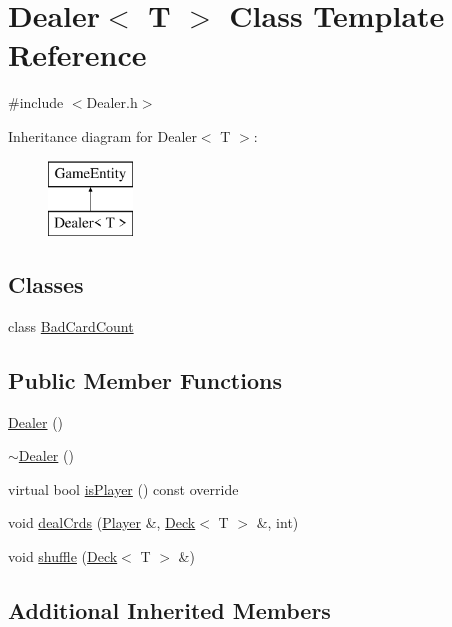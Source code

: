 \hypertarget{class_dealer}{}\section{Dealer$<$ T $>$ Class Template Reference}
\label{class_dealer}


{\ttfamily \#include $<$Dealer.\+h$>$}

Inheritance diagram for Dealer$<$ T $>$\+:\begin{figure}[H]
\begin{center}
\leavevmode
\includegraphics[height=2.000000cm]{class_dealer}
\end{center}
\end{figure}
\subsection*{Classes}
\begin{DoxyCompactItemize}
\item 
class \mbox{\hyperlink{class_dealer_1_1_bad_card_count}{Bad\+Card\+Count}}
\end{DoxyCompactItemize}
\subsection*{Public Member Functions}
\begin{DoxyCompactItemize}
\item 
\mbox{\hyperlink{class_dealer_a6b2f0b132a7aac7650308365f9bb5cd7}{Dealer}} ()
\item 
\mbox{\hyperlink{class_dealer_a775914655b99de05565bcc2e117f47c5}{$\sim$\+Dealer}} ()
\item 
virtual bool \mbox{\hyperlink{class_dealer_aa59b2493c7935d90eeb046433af00fa2}{is\+Player}} () const override
\item 
void \mbox{\hyperlink{class_dealer_a26da04b81fcbeaa6c7fb68e04de5bc8e}{deal\+Crds}} (\mbox{\hyperlink{class_player}{Player}} \&, \mbox{\hyperlink{class_deck}{Deck}}$<$ T $>$ \&, int)
\item 
void \mbox{\hyperlink{class_dealer_ad15430c5e44be12ed63fa5a8bccf5205}{shuffle}} (\mbox{\hyperlink{class_deck}{Deck}}$<$ T $>$ \&)
\end{DoxyCompactItemize}
\subsection*{Additional Inherited Members}


